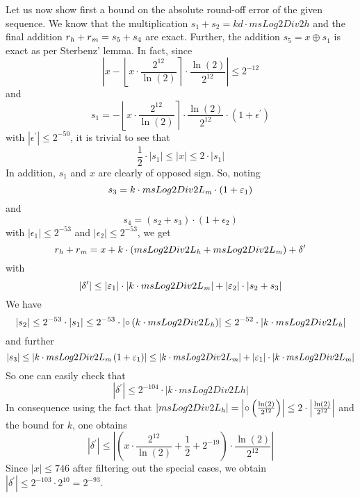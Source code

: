 Let us now show first a bound on the absolute round-off error of the
given sequence.  We know that the multiplication $s_1 + s_2 = kd \cdot
msLog2Div2h$ and the final addition $r_{\mathit{h}} + r_{\mathit{m}} = s_5 + s_4$ are
exact. Further, the addition $s_5 = x \oplus s_1$ is exact as per Sterbenz' lemma.
In fact, since 
$$\left \vert x - \left \lfloor x \cdot
\frac{2^{12}}{\ln\left(2\right)} \right \rceil \cdot
\frac{\ln\left(2\right)}{2^{12}} \right \vert \leq 2^{-12}$$ and
$$s_1 = - \left \lfloor x \cdot \frac{2^{12}}{\ln\left(2\right)}
\right \rceil \cdot \frac{\ln\left(2\right)}{2^{12}} \cdot \left( 1 + \epsilon^\prime \right)$$
with $\left \vert \epsilon^\prime \right \vert \leq 2^{-50}$, it is trivial to see that
$$\frac{1}{2} \cdot \left \vert s_1 \right \vert \leq \left \vert x
\right \vert \leq 2 \cdot \left \vert s_1 \right \vert$$ In addition,
$s_1$ and $x$ are clearly of opposed sign. So, noting
$$s_3 = k \cdot msLog2Div2L_{\mathit{m}} \cdot \left( 1 + \varepsilon_1 \right)$$ and
$$s_4 = \left( s_2 + s_3 \right) \cdot \left( 1 + \epsilon_2 \right)$$
with $\left \vert \epsilon_1 \right \vert \leq 2^{-53}$ and $\left
\vert \epsilon_2 \right \vert \leq 2^{-53}$, we get
$$r_{\mathit{h}} + r_{\mathit{m}} = x + k \cdot \left( msLog2Div2L_{\mathit{h}} + msLog2Div2L_{\mathit{m}} \right) + \delta^\prime$$
with 
$$\left \vert \delta^\prime \right \vert \leq \left \vert \varepsilon_1 \right
\vert \cdot \left \vert k \cdot msLog2Div2L_{\mathit{m}} \right \vert + \left
\vert \varepsilon_2 \right \vert \cdot \left \vert s_2 + s_3 \right
\vert$$
We have
$$\left \vert s_2 \right \vert \leq 2^{-53} \cdot \left \vert s_1
\right \vert \leq 2^{-53} \cdot \left \vert \circ \left( k \cdot
msLog2Div2L_{\mathit{h}} \right) \right \vert \leq 2^{-52} \cdot \left \vert k
\cdot msLog2Div2L_{\mathit{h}} \right \vert$$
and further
$$\left \vert s_3 \right \vert \leq \left \vert k \cdot msLog2Div2L_{\mathit{m}} \left( 1 + \varepsilon_1 \right) \right \vert
\leq \left \vert k \cdot msLog2Div2L_{\mathit{m}} \right \vert + \left \vert \varepsilon_1 \right \vert \cdot
\left \vert k \cdot msLog2Div2L_{\mathit{m}} \right \vert$$
So one can easily check that 
$$\left \vert \delta^\prime \right \vert \leq 2^{-104} \cdot \left
\vert k \cdot msLog2Div2Lh \right \vert$$ In consequence using the
fact that $\left \vert msLog2Div2L_{\mathit{h}} \right \vert = \left \vert \circ
\left( \frac{\ln\left( 2 \right)}{2^{12}} \right) \right \vert \leq 2
\cdot \left \vert \frac{\ln\left( 2 \right)}{2^{12}} \right \vert$ and
the bound for $k$, one obtains
$$\left \vert \delta^\prime \right \vert \leq \left \vert \left( x
\cdot \frac{2^{12}}{\ln\left( 2 \right)} + \frac{1}{2} + 2^{-19}
\right) \cdot \frac{\ln\left( 2 \right)}{2^{12}} \right \vert$$ Since
$\left \vert x \right \vert \leq 746$ after filtering out the special
cases, we obtain $\left \vert \delta^\prime \right \vert \leq 2^{-103}
\cdot 2^{10} = 2^{-93}$.  

